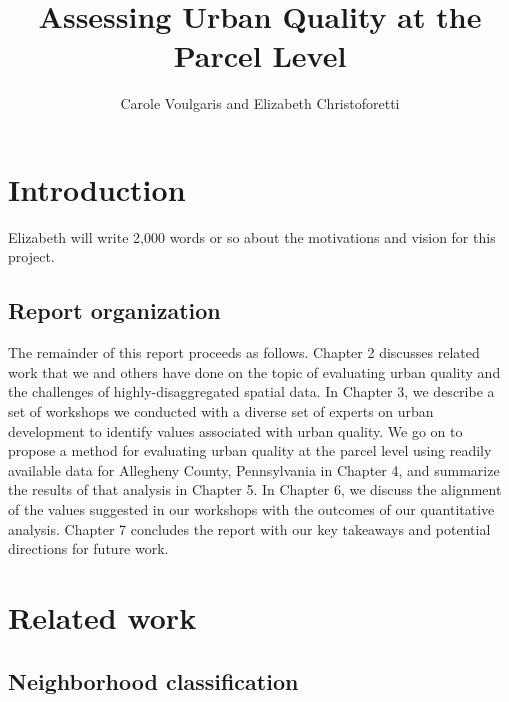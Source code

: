 \documentclass[
]{book}
\title{Assessing Urban Quality at the Parcel Level}
\author{Carole Voulgaris and Elizabeth Christoforetti}
\date{}
\begin{document}
\maketitle

{
\setcounter{tocdepth}{1}
\tableofcontents
}
\hypertarget{introduction}{%
\chapter{Introduction}\label{introduction}}

Elizabeth will write 2,000 words or so about the motivations and vision for
this project.

\hypertarget{report-organization}{%
\section{Report organization}\label{report-organization}}

The remainder of this report proceeds as follows. Chapter 2 discusses related
work that we and others have done on the topic of evaluating urban quality
and the challenges of highly-disaggregated spatial data. In Chapter 3, we
describe a set of workshops we conducted with a diverse set of experts on
urban development to identify values associated with urban quality. We go on
to propose a method for evaluating urban quality at the parcel level using
readily available data for Allegheny County, Pennsylvania in Chapter 4, and
summarize the results of that analysis in Chapter 5. In Chapter 6, we discuss
the alignment of the values suggested in our workshops with the outcomes
of our quantitative analysis. Chapter 7 concludes the report with our key
takeaways and potential directions for future work.

\hypertarget{related-work}{%
\chapter{Related work}\label{related-work}}

\hypertarget{neighborhood-classification}{%
\section{Neighborhood classification}\label{neighborhood-classification}}
\end{document}
